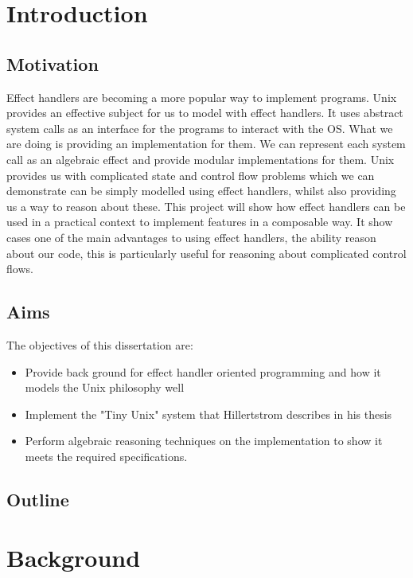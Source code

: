 \documentclass[logo,bsc,singlespacing,parskip]{infthesis}
\begin{document}
\chapter{Introduction}
\section{Motivation}
Effect handlers are becoming a more popular way to implement programs. Unix provides an effective subject for us to model with effect handlers. It uses abstract system calls as an interface for the programs to interact with the OS. What we are doing is providing an implementation for them. We can represent each system call as an algebraic effect and provide modular implementations for them.
Unix provides us with complicated state and control flow problems which we can demonstrate can be simply modelled using effect handlers, whilst also providing us a way to reason about these. 
This project will show how effect handlers can be used in a practical context to implement features in a composable way. It show cases one of the main advantages to using effect handlers, the ability reason about our code, this is particularly useful for reasoning about complicated control flows. 



\section{Aims}
The objectives of this dissertation are:
\begin{itemize}
    \item Provide back ground for effect handler oriented programming and how it models the Unix philosophy well
    \item Implement the "Tiny Unix" system that Hillertstrom describes in his thesis
    \item Perform algebraic reasoning techniques on the implementation to show it meets the required specifications. 
    
\end{itemize}

\section{Outline}


\chapter{Background}
\end{document}
